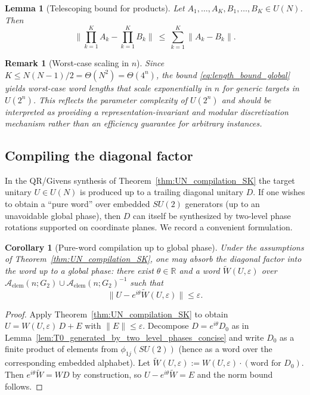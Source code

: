 \documentclass[10pt,a4paper]{amsart}
\newtheorem{lemma}{Lemma}
\newtheorem{remark}{Remark}
\newtheorem{corollary}{Corollary}
\begin{document}
\begin{lemma}[Telescoping bound for products]
\label{lem:error_accumulation}
Let $A_1,\dots,A_K,B_1,\dots,B_K\in U(N)$. Then
\[
\Big\|\prod_{k=1}^K A_k-\prod_{k=1}^K B_k\Big\|
\ \le\
\sum_{k=1}^K \|A_k-B_k\|.
\]
\end{lemma}

\begin{remark}[Worst-case scaling in $n$]\label{rem:worst_case_scaling}
Since $K\le N(N-1)/2=\Theta(N^2)=\Theta(4^n)$, the bound \eqref{eq:length_bound_global} yields worst-case word lengths that scale
exponentially in $n$ for generic targets in $U(2^n)$. This reflects the parameter complexity of $U(2^n)$ and should be interpreted
as providing a representation-invariant and modular discretization mechanism rather than an efficiency guarantee for arbitrary
instances.
\end{remark}

\subsection{Compiling the diagonal factor}
\label{subsec:compile_diagonal_optional}

In the QR/Givens synthesis of Theorem~\ref{thm:UN_compilation_SK} the target unitary $U\in U(N)$ is produced up to a trailing diagonal
unitary $D$. If one wishes to obtain a ``pure word'' over embedded $SU(2)$ generators (up to an unavoidable global phase), then $D$ can
itself be synthesized by two-level phase rotations supported on coordinate planes. We record a convenient formulation.


\begin{corollary}[Pure-word compilation up to global phase]
\label{cor:pure_word_compilation}
Under the assumptions of Theorem~\ref{thm:UN_compilation_SK}, one may absorb the diagonal factor into the word up to a global phase:
there exist $\theta\in\mathbb{R}$ and a word $\widetilde W(U,\varepsilon)$ over
$\mathcal{A}_{\mathrm{elem}}(n;G_2)\cup\mathcal{A}_{\mathrm{elem}}(n;G_2)^{-1}$ such that
\[
\big\|U-e^{i\theta}\widetilde W(U,\varepsilon)\big\|\le \varepsilon.
\]
\end{corollary}

\begin{proof}
Apply Theorem~\ref{thm:UN_compilation_SK} to obtain $U=W(U,\varepsilon)\,D+E$ with $\|E\|\le\varepsilon$.
Decompose $D=e^{i\theta}D_0$ as in Lemma~\ref{lem:T0_generated_by_two_level_phases_concise} and write $D_0$ as a finite product of
elements from $\phi_{1j}(SU(2))$ (hence as a word over the corresponding embedded alphabet).
Let $\widetilde W(U,\varepsilon):=W(U,\varepsilon)\cdot(\text{word for }D_0)$. Then $e^{i\theta}\widetilde W=W D$ by construction, so
$U-e^{i\theta}\widetilde W=E$ and the norm bound follows.
\end{proof}
\end{document}
